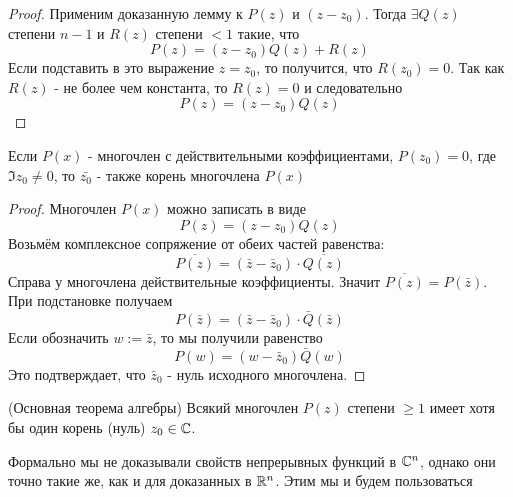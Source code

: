 \begin{proof}
	Применим доказанную лемму к $P(z)$ и $(z - z_0)$. Тогда $\exists Q(z)$ степени $n - 1$ и $R(z)$ степени $< 1$ такие, что
	\[
		P(z) = (z - z_0)Q(z) + R(z)
	\]
	Если подставить в это выражение $z = z_0$, то получится, что $R(z_0) = 0$. Так как $R(z)$ - не более чем константа, то $R(z) = 0$ и следовательно
	\[
		P(z) = (z - z_0)Q(z)
	\]
\end{proof}

\begin{lemma}
	Если $P(x)$ - многочлен с действительными коэффициентами, $P(z_0) = 0$, где $\Im z_0 \neq 0$, то $\bar{z_0}$ - также корень многочлена $P(x)$
\end{lemma}

\begin{proof}
	Многочлен $P(x)$ можно записать в виде
	\[
		P(z) = (z - z_0)Q(z)
	\]
	Возьмём комплексное сопряжение от обеих частей равенства:
	\[
		\overline{P(z)} = (\bar{z} - \bar{z}_0) \cdot \overline{Q(z)}
	\]
	Справа у многочлена действительные коэффициенты. Значит $\overline{P(z)} = P(\bar{z})$. При подстановке получаем
	\[
		P(\bar{z}) = (\bar{z} - \bar{z}_0) \cdot \bar{Q}(\bar{z})
	\]
	Если обозначить $w := \bar{z}$, то мы получили равенство
	\[
		P(w) = (w - \bar{z}_0)\bar{Q}(w)
	\]
	Это подтверждает, что $\bar{z}_0$ - нуль исходного многочлена.
\end{proof}

\begin{theorem} (Основная теорема алгебры)
	Всякий многочлен $P(z)$ степени $\ge 1$ имеет хотя бы один корень (нуль) $z_0 \in \mathbb{C}$.
\end{theorem}

\begin{note}
	Формально мы не доказывали свойств непрерывных функций в $\mathbb{C}^n$, однако они точно такие же, как и для доказанных в $\mathbb{R}^n$. Этим мы и будем пользоваться
\end{note}

